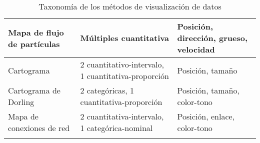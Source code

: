 \begin{longtable}{ | P{5cm} | P{5cm} | P{5cm} |}
  Mapa de flujo de partículas & Múltiples cuantitativa                                        & Posición, dirección, grueso, velocidad \\
  \hline
  Cartograma                 & 2 cuantitativo-intervalo, 1 cuantitativa-proporción            & Posición, tamaño \\
  \hline
  Cartograma de Dorling      & 2 categóricas, 1 cuantitativa-proporción                       & Posición, tamaño, color-tono \\
  \hline
  Mapa de conexiones de red  & 2 cuantitativa-intervalo, 1 categórica-nominal                 & Posición, enlace, color-tono \\
  \hline
  \caption[Taxonomía de los métodos de visualización de datos]{Taxonomía de los métodos de visualización de datos}
  \label{table:appa}
 \end{longtable}
